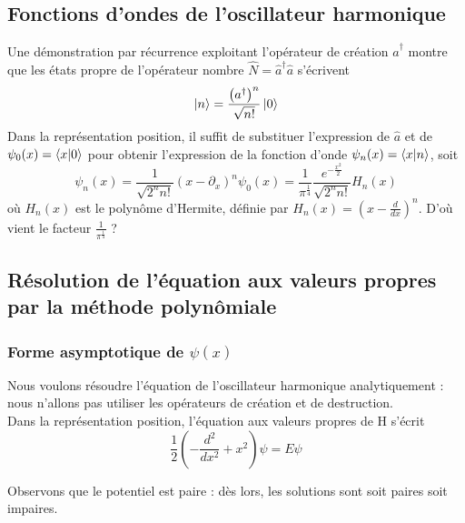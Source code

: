 \documentclass[../Notesdecours.tex]{subfiles}
\begin{document}
\subsection{Fonctions d'ondes de l'oscillateur harmonique}

Une démonstration par récurrence exploitant l'opérateur de création $\hat{a}^\dagger$ montre que les états propre de l'opérateur nombre $\hat{N} = \hat{a}^\dagger\hat{a}$ s'écrivent
\begin{equation}
    \ket{n}=\frac{\left(a^\dagger\right)^n}{\sqrt{n!}}\ket{0}
\end{equation}
Dans la représentation position, il suffit de substituer l'expression de $\hat{a}$ et de $\psi_0 (x) = \braket{x|0}$ pour obtenir l'expression de la fonction d'onde $\psi_n (x) = \braket{x|n}$, soit
\begin{equation}
    \psi_n (x) = \frac{1}{\sqrt{2^n n!}}\left(x-\partial_x\right)^n\psi_0(x) = \frac{1}{\pi^{\frac{1}{4}}}\frac{e^{-\frac{x^2}{2}}}{\sqrt{2^nn!}}H_n(x)
\end{equation}
où $H_n(x)$ est le polynôme d'Hermite, définie par $H_n(x) = \left(x-\frac{d}{dx}\right)^n$. \color{red} D'où vient le facteur $\frac{1}{\pi^\frac{1}{4}}$ ? \color{black}

\subsection{Résolution de l'équation aux valeurs propres par la méthode polynômiale}
\subsubsection{Forme asymptotique de $\psi(x)$}

Nous voulons résoudre l'équation de l'oscillateur harmonique analytiquement : nous n'allons pas utiliser les opérateurs de création et de destruction.\\

Dans la représentation position, l'équation aux valeurs propres de H s'écrit 
\begin{equation}
    \label{VP H}
    \frac{1}{2}\left(-\frac{d^2}{dx^2}+x^2\right)\psi = E\psi 
\end{equation}

Observons que le potentiel est paire : dès lors, les solutions sont soit paires soit impaires.\\
\end{document}

